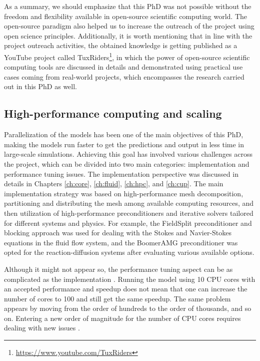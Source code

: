 As a summary, we should emphasize that this PhD was not possible without the freedom and flexibility available in open-source scientific computing world. The open-source paradigm also helped us to increase the outreach of the project using open science principles. Additionally, it is worth mentioning that in line with the project outreach activities, the obtained knowledge is getting published as a YouTube project called TuxRiders\footnote{\url{https://www.youtube.com/TuxRiders}}, in which the power of open-source scientific computing tools are discussed in details and demonstrated using practical use cases coming from real-world projects, which encompasses the research carried out in this PhD as well.


\subsection{High-performance computing and scaling} \label{sec:conclusion_hpc}

Parallelization of the models has been one of the main objectives of this PhD, making the models run faster to get the predictions and output in less time in large-scale simulations. Achieving this goal has involved various challenges across the project, which can be divided into two main categories: implementation and performance tuning issues. The implementation perspective was discussed in details in Chapters \ref{ch:core}, \ref{ch:fluid}, \ref{ch:hpc}, and \ref{ch:cup}. The main implementation strategy was based on high-performance mesh decomposition, partitioning and distributing the mesh among available computing resources, and then utilization of high-performance preconditioners and iterative solvers tailored for different systems and physics. For example, the FieldSplit preconditioner and blocking approach was used for dealing with the Stokes and Navier-Stokes equations in the fluid flow system, and the BoomerAMG preconditioner was opted for the reaction-diffusion systems after evaluating various available options. 

Although it might not appear so, the performance tuning aspect can be as complicated as the implementation \cite{Mikailov2019,Bailey2010}. Running the model using 10 \gls{CPU} cores with an accepted performance and speedup does not mean that one can increase the number of cores to 100 and still get the same speedup. The same problem appears by moving from the order of hundreds to the order of thousands, and so on. Entering a new order of magnitude for the number of \gls{CPU} cores requires dealing with new issues \cite{Hager2011,Goedecker2001,Wadleigh2000}.

